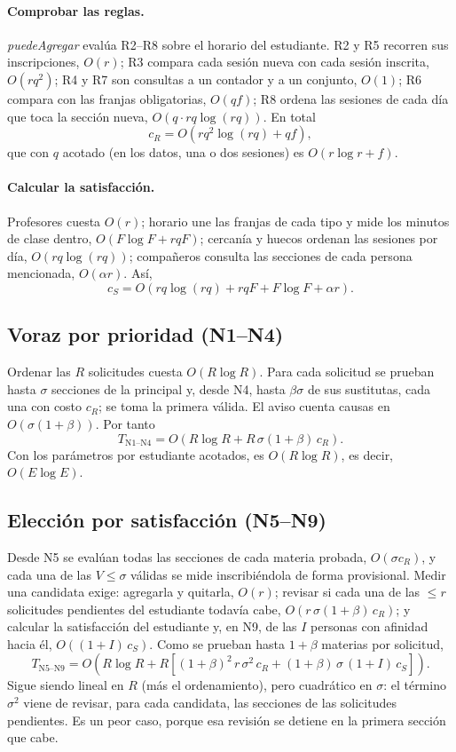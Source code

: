 \paragraph{Comprobar las reglas.} \emph{puedeAgregar} evalúa R2--R8 sobre el horario del estudiante. R2 y R5 recorren sus inscripciones, $O(r)$; R3 compara cada sesión nueva con cada sesión inscrita, $O(r q^2)$; R4 y R7 son consultas a un contador y a un conjunto, $O(1)$; R6 compara con las franjas obligatorias, $O(q f)$; R8 ordena las sesiones de cada día que toca la sección nueva, $O(q \cdot rq \log(rq))$. En total
\[
c_R = O\!\left(r q^2 \log(rq) + q f\right),
\]
que con $q$ acotado (en los datos, una o dos sesiones) es $O(r \log r + f)$.

\paragraph{Calcular la satisfacción.} Profesores cuesta $O(r)$; horario une las franjas de cada tipo y mide los minutos de clase dentro, $O(F \log F + rqF)$; cercanía y huecos ordenan las sesiones por día, $O(rq \log(rq))$; compañeros consulta las secciones de cada persona mencionada, $O(\alpha r)$. Así,
\[
c_S = O\!\left(rq \log(rq) + rqF + F \log F + \alpha r\right).
\]

\subsection{Voraz por prioridad (N1--N4)}

Ordenar las $R$ solicitudes cuesta $O(R \log R)$. Para cada solicitud se prueban hasta $\sigma$ secciones de la principal y, desde N4, hasta $\beta\sigma$ de sus sustitutas, cada una con costo $c_R$; se toma la primera válida. El aviso cuenta causas en $O(\sigma(1+\beta))$. Por tanto
\[
T_{\mathrm{N1\text{--}N4}} = O\!\left(R \log R + R\,\sigma(1+\beta)\,c_R\right).
\]
Con los parámetros por estudiante acotados, es $O(R \log R)$, es decir, $O(E \log E)$.

\subsection{Elección por satisfacción (N5--N9)}

Desde N5 se evalúan todas las secciones de cada materia probada, $O(\sigma c_R)$, y cada una de las $V \le \sigma$ válidas se mide inscribiéndola de forma provisional. Medir una candidata exige: agregarla y quitarla, $O(r)$; revisar si cada una de las $\le r$ solicitudes pendientes del estudiante todavía cabe, $O(r\,\sigma(1+\beta)\,c_R)$; y calcular la satisfacción del estudiante y, en N9, de las $I$ personas con afinidad hacia él, $O((1+I)\,c_S)$. Como se prueban hasta $1+\beta$ materias por solicitud,
\[
T_{\mathrm{N5\text{--}N9}} = O\!\left(R \log R + R\left[(1+\beta)^2\, r\, \sigma^2\, c_R + (1+\beta)\,\sigma\,(1+I)\,c_S\right]\right).
\]
Sigue siendo lineal en $R$ (más el ordenamiento), pero cuadrático en $\sigma$: el término $\sigma^2$ viene de revisar, para cada candidata, las secciones de las solicitudes pendientes. Es un peor caso, porque esa revisión se detiene en la primera sección que cabe.

